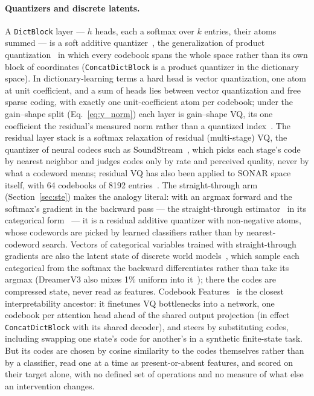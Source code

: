 \documentclass[11pt]{article}
\begin{document}
\paragraph{Quantizers and discrete latents.}
A \texttt{DictBlock} layer --- $h$ heads, each a softmax over $k$ entries,
their atoms summed --- is a soft additive quantizer~\cite{babenko2014}, the
generalization of product quantization~\cite{jegou2011} in which every
codebook spans the whole space rather than its own block of coordinates
(\texttt{ConcatDictBlock} is a product quantizer in the dictionary space).
In dictionary-learning terms a hard head is vector quantization, one atom
at unit coefficient, and a sum of heads lies between vector quantization
and free sparse coding, with exactly one unit-coefficient atom per
codebook; under the gain--shape split (Eq.~\eqref{eq:y_norm}) each layer
is gain--shape VQ, its one coefficient the residual's measured norm rather
than a quantized index~\cite{aharon2006}.
The residual layer stack is a softmax relaxation of residual (multi-stage)
VQ, the quantizer of neural codecs such as SoundStream~\cite{zeghidour2021},
which picks each stage's code by nearest neighbor and judges codes only by
rate and perceived quality, never by what a codeword means; residual VQ has
also been applied to SONAR space itself, with 64 codebooks of 8192
entries~\cite{lcmteam2024largeconceptmodelslanguage}. The straight-through
arm (Section~\ref{sec:ste}) makes the analogy literal: with an argmax
forward and the softmax's gradient in the backward pass --- the
straight-through estimator~\cite{bengio2013} in its categorical
form~\cite{jang2017} --- it is a residual additive quantizer with
non-negative atoms, whose codewords are picked by learned classifiers
rather than by nearest-codeword search. Vectors of categorical variables
trained with straight-through gradients are also the latent state of
discrete world models~\cite{hafner2021,hafner2023}, which sample each
categorical from the softmax the backward differentiates rather than take
its argmax (DreamerV3 also mixes 1\% uniform into it~\cite{hafner2023});
there the codes are compressed state, never read as features. Codebook Features~\cite{tamkin2023} is the
closest interpretability ancestor: it finetunes VQ bottlenecks into
a network, one codebook per attention head ahead of the shared output
projection (in effect \texttt{ConcatDictBlock} with its shared decoder),
and steers by substituting codes, including swapping one state's code for
another's in a synthetic finite-state task. But its codes are chosen by
cosine similarity to the codes themselves rather than by a classifier,
read one at a time as present-or-absent features, and scored on their
target alone, with no defined set of operations and no measure of what
else an intervention changes.
\end{document}

